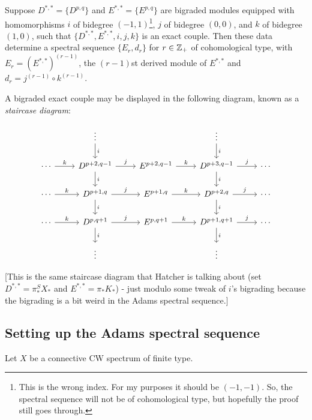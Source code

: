 \documentclass{MetricNotes2023}
\def\inte{\ensuremath\mathbb{Z}}
\begin{document}
\begin{theorem}\label{2503301131}
Suppose \(D^{*,*}=\{D^{p,q}\}\) and \(E^{*,*}=\{E^{p,q}\}\) are bigraded modules equipped with homomorphisms \(i\) of bidegree \((-1,1)\)\footnote{This is the wrong index. For my purposes it should be \((-1, -1)\). So, the spectral sequence will not be of cohomological type, but hopefully the proof still goes through.}, \(j\) of bidegree \((0,0)\), and \(k\) of bidegree \((1,0)\), such that \(\{D^{*,*}, E^{*,*}, i, j, k\}\) is an exact couple. Then these data determine a spectral sequence \(\{E_r, d_r\}\) for \(r\in \inte_+\) of cohomological type, with \(E_r=(E^{*,*})^{(r-1)}\), the \((r-1)\)st derived module of \(E^{*,*}\) and \(d_r=j^{(r-1)}\circ k^{(r-1)}\).
\end{theorem}

A bigraded exact couple may be displayed in the following diagram, known as a \textit{staircase diagram}:

\[\begin{tikzcd} 
   &  \vdots \arrow[d, "i"] &  & \vdots \arrow[d, "i"] & \\
 \cdots \arrow[r, "k"] & D^{p+2, q-1} \arrow[d, "i"] \arrow[r, "j"] & E^{p+2,q-1}  \arrow[r, "k"] & D^{p+3,q-1} \arrow[d, "i"] \arrow[r, "j"] & \cdots \\
 \cdots \arrow[r, "k"] & D^{p+1,q} \arrow[d, "i"] \arrow[r, "j"] & E^{p+1,q}  \arrow[r, "k"] & D^{p+2,q} \arrow[d, "i"] \arrow[r, "j"] & \cdots \\
 \cdots \arrow[r, "k"] & D^{p,q+1}  \arrow[d, "i"] \arrow[r, "j"] & E^{p,q+1}  \arrow[r, "k"] & D^{p+1,q+1} \arrow[d, "i"] \arrow[r, "j"] & \cdots \\
 & \vdots &  & \vdots & 
\end{tikzcd}\]

[This is the same staircase diagram that Hatcher is talking about (set \(D^{*,*}=\pi_*^SX_*\) and \(E^{*,*}=\pi_*K_*\)) - just modulo some tweak of \(i\)'s bigrading because the bigrading is a bit weird in the Adams spectral sequence.]

\subsection{Setting up the Adams spectral sequence}

Let \(X\) be a connective CW spectrum of finite type.
\end{document}
